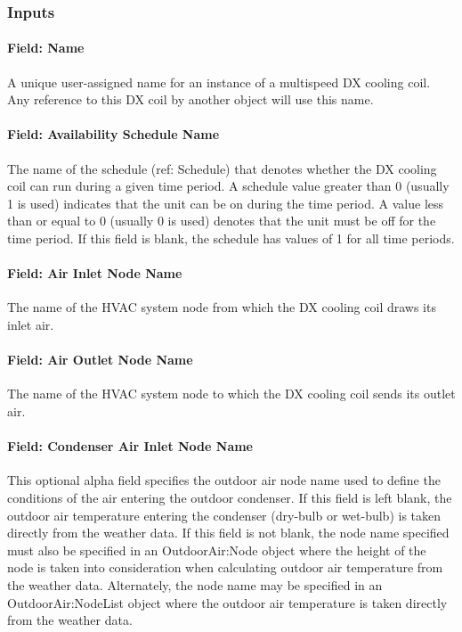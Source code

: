 \subsubsection{Inputs}\label{inputs-16-003}

\paragraph{Field: Name}\label{field-name-15-002}

A unique user-assigned name for an instance of a multispeed DX cooling coil. Any reference to this DX coil by another object will use this name.

\paragraph{Field: Availability Schedule Name}\label{field-availability-schedule-name-9-000}

The name of the schedule (ref: Schedule) that denotes whether the DX cooling coil can run during a given time period. A schedule value greater than 0 (usually 1 is used) indicates that the unit can be on during the time period. A value less than or equal to 0 (usually 0 is used) denotes that the unit must be off for the time period. If this field is blank, the schedule has values of 1 for all time periods.

\paragraph{Field: Air Inlet Node Name}\label{field-air-inlet-node-name-11}

The name of the HVAC system node from which the DX cooling coil draws its inlet air.

\paragraph{Field: Air Outlet Node Name}\label{field-air-outlet-node-name-11}

The name of the HVAC system node to which the DX cooling coil sends its outlet air.

\paragraph{Field: Condenser Air Inlet Node Name}\label{field-condenser-air-inlet-node-name-2}

This optional alpha field specifies the outdoor air node name used to define the conditions of the air entering the outdoor condenser. If this field is left blank, the outdoor air temperature entering the condenser (dry-bulb or wet-bulb) is taken directly from the weather data. If this field is not blank, the node name specified must also be specified in an OutdoorAir:Node object where the height of the node is taken into consideration when calculating outdoor air temperature from the weather data. Alternately, the node name may be specified in an OutdoorAir:NodeList object where the outdoor air temperature is taken directly from the weather data.

